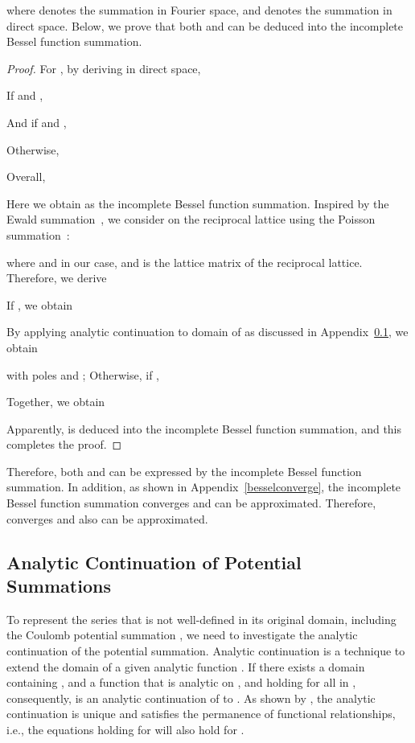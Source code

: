 \documentclass[nohyperref]{article}
\theoremstyle{plain}
\theoremstyle{definition}
\theoremstyle{remark}
\begin{document}
where  denotes the summation in Fourier space, and 
 denotes the summation in direct space. Below, we prove that both  and  can be deduced into the incomplete Bessel function summation.
\begin{proof}
For , by deriving in direct space,

If  and , 

And if  and , 

Otherwise,

Overall,

Here we obtain  as the incomplete Bessel function summation. Inspired by the Ewald summation~\citep{ewald, epstein}, we consider  on the reciprocal lattice using the Poisson summation~\citep{epstein}: 

where  and  in our case, and  is the lattice matrix of the reciprocal lattice. Therefore, we derive

If , we obtain

By applying analytic continuation to domain of  as discussed in Appendix~\ref{analytic}, we obtain

with poles  and ; Otherwise, if ,

Together, we obtain

Apparently,  is deduced into the incomplete Bessel function summation, and this completes the proof.
\end{proof}
Therefore, both  and  can be expressed by the incomplete Bessel function summation. In addition, as shown in Appendix~\ref{besselconverge}, the incomplete Bessel function summation  converges and can be approximated. Therefore,  converges and also can be approximated.

\subsection{Analytic Continuation of Potential Summations}
\label{analytic}

To represent the series that is not well-defined in its original domain, including the Coulomb potential summation , we need to investigate the analytic continuation of the potential summation. Analytic continuation is a technique to extend the domain  of a given analytic function . If there exists a domain  containing , and a function  that is analytic on , and  holding for all  in , consequently,  is an analytic continuation of  to . As shown by \citet{kung2003complex}, the analytic continuation is unique and satisfies the permanence of functional relationships, i.e., the equations holding for  will also hold for . 
\end{document}
